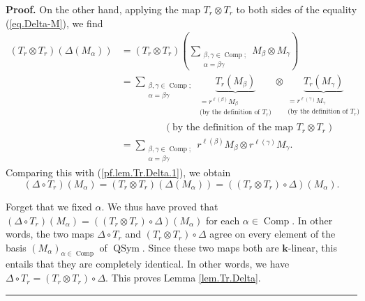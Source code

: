 \documentclass[numbers=enddot,12pt,final,onecolumn,notitlepage]{scrartcl}%
\theoremstyle{definition}
\newenvironment{proof}[1][Proof]{\noindent\textbf{#1.} }{\ \rule{0.5em}{0.5em}}
\let\sumnonlimits\sum
\renewcommand{\sum}{\sumnonlimits\limits}
\newenvironment{verlong}{}{}
\begin{document}
\begin{verlong}
\begin{proof}
On the other hand, applying the map $T_{r}\otimes T_{r}$ to both sides of the
equality (\ref{eq.Delta-M}), we find%
\begin{align*}
\left(  T_{r}\otimes T_{r}\right)  \left(  \Delta\left(  M_{\alpha}\right)
\right)   &  =\left(  T_{r}\otimes T_{r}\right)  \left(  \sum_{\substack{\beta
,\gamma\in\operatorname*{Comp};\\\alpha=\beta\gamma}}M_{\beta}\otimes
M_{\gamma}\right) \\
&  =\sum_{\substack{\beta,\gamma\in\operatorname*{Comp};\\\alpha=\beta\gamma
}}\underbrace{T_{r}\left(  M_{\beta}\right)  }_{\substack{=r^{\ell\left(
\beta\right)  }M_{\beta}\\\text{(by the definition of }T_{r}\text{)}}%
}\otimes\underbrace{T_{r}\left(  M_{\gamma}\right)  }_{\substack{=r^{\ell
\left(  \gamma\right)  }M_{\gamma}\\\text{(by the definition of }T_{r}%
\text{)}}}\\
&  \ \ \ \ \ \ \ \ \ \ \ \ \ \ \ \ \ \ \ \ \left(  \text{by the definition of
the map }T_{r}\otimes T_{r}\right) \\
&  =\sum_{\substack{\beta,\gamma\in\operatorname*{Comp};\\\alpha=\beta\gamma
}}r^{\ell\left(  \beta\right)  }M_{\beta}\otimes r^{\ell\left(  \gamma\right)
}M_{\gamma}.
\end{align*}
Comparing this with (\ref{pf.lem.Tr.Delta.1}), we obtain%
\[
\left(  \Delta\circ T_{r}\right)  \left(  M_{\alpha}\right)  =\left(
T_{r}\otimes T_{r}\right)  \left(  \Delta\left(  M_{\alpha}\right)  \right)
=\left(  \left(  T_{r}\otimes T_{r}\right)  \circ\Delta\right)  \left(
M_{\alpha}\right)  .
\]


Forget that we fixed $\alpha$. We thus have proved that $\left(  \Delta\circ
T_{r}\right)  \left(  M_{\alpha}\right)  =\left(  \left(  T_{r}\otimes
T_{r}\right)  \circ\Delta\right)  \left(  M_{\alpha}\right)  $ for each
$\alpha\in\operatorname*{Comp}$. In other words, the two maps $\Delta\circ
T_{r}$ and $\left(  T_{r}\otimes T_{r}\right)  \circ\Delta$ agree on every
element of the basis $\left(  M_{\alpha}\right)  _{\alpha\in
\operatorname*{Comp}}$ of $\operatorname*{QSym}$. Since these two maps both
are $\mathbf{k}$-linear, this entails that they are completely identical. In
other words, we have $\Delta\circ T_{r}=\left(  T_{r}\otimes T_{r}\right)
\circ\Delta$. This proves Lemma \ref{lem.Tr.Delta}.
\end{proof}
\end{verlong}
\end{document}

